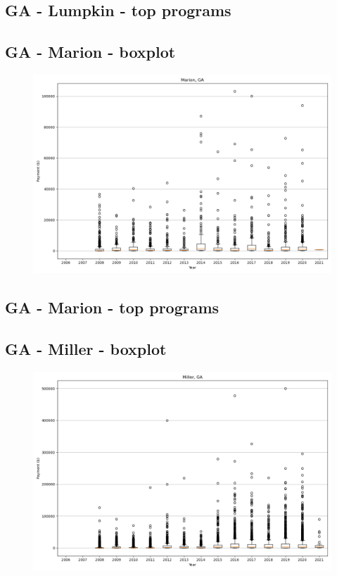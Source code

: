 \subsection*{GA - Lumpkin - top programs}

\newpage
\subsection*{GA - Marion - boxplot}
\begin{figure}[h]
\centering
\includegraphics[width=7in]{../output/boxplots/counties/Marion-GA_boxplot.png}
\end{figure}


\subsection*{GA - Marion - top programs}

\newpage
\subsection*{GA - Miller - boxplot}
\begin{figure}[h]
\centering
\includegraphics[width=7in]{../output/boxplots/counties/Miller-GA_boxplot.png}
\end{figure}



